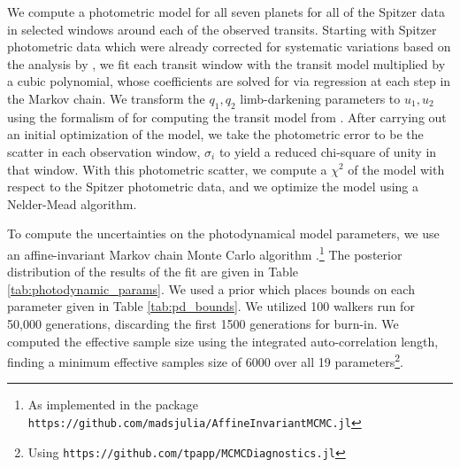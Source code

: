 \documentclass[twocolumn]{aastex63}
\begin{document}
We compute a photometric model for all seven
planets for all of the Spitzer data in selected windows around each of the observed
transits.  Starting with Spitzer photometric data which were already corrected for systematic
variations based on the analysis by \citet{Ducrot2020}, we fit  each transit window
with the transit model multiplied by a cubic polynomial, whose coefficients are solved
for via regression at each step in the Markov chain.
We
transform the $q_1, q_2$ limb-darkening
parameters to $u_1,u_2$ using the formalism of \citet{Kipping2013} for computing the transit model from \citet{Agol2019}.  After carrying out an initial
optimization of the model, we take the photometric error to be the
scatter in each observation window, $\sigma_i$ to yield a reduced chi-square of unity in
that  window.  With this photometric
scatter, we compute a $\chi^2$ of the model with respect to the Spitzer
photometric data, and we optimize the model using a Nelder-Mead algorithm.

To compute the uncertainties on the photodynamical model parameters, we
use an affine-invariant Markov chain Monte Carlo algorithm \citep{Goodman2010}.\footnote{As
    implemented in the package \texttt{https://github.com/madsjulia/AffineInvariantMCMC.jl}}
The posterior distribution of the results of the fit are given in Table \ref{tab:photodynamic_params}.
We used a prior which places bounds on
each parameter given in
Table \ref{tab:pd_bounds}.
We utilized 100 walkers run for 50,000 generations, discarding the first 1500 generations
for burn-in.  We computed the effective sample size using the integrated
auto-correlation length, finding a minimum effective samples size of 6000 over all
19 parameters\footnote{Using \texttt{https://github.com/tpapp/MCMCDiagnostics.jl}}.
\end{document}
